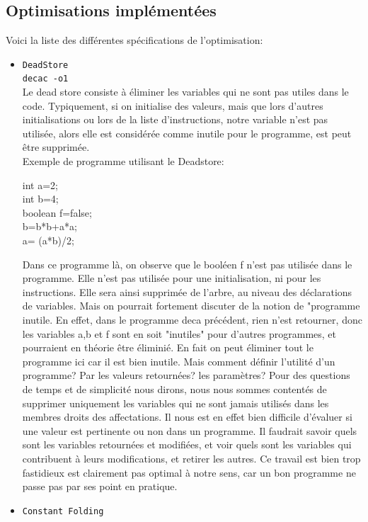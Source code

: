\documentclass[a4paper]{article}
\begin{document}
\subsection{Optimisations implémentées}
Voici la liste des différentes spécifications de l'optimisation:
\begin{itemize}
\item \texttt{DeadStore} \\
      \texttt{decac -o1} \\
Le dead store consiste à éliminer les variables qui ne sont pas utiles dans le code. Typiquement, si on initialise des valeurs, mais que lors d'autres initialisations ou lors de la liste d'instructions, notre variable n'est pas utilisée, alors elle est considérée comme inutile pour le programme, est peut être supprimée. \\
Exemple de programme utilisant le Deadstore:
\begin{center}
int a=2;\\
int b=4;\\
boolean f=false;\\
b=b*b+a*a;\\
a= (a*b)/2;\\
\end{center}
Dans ce programme là, on observe que le booléen f n'est pas utilisée dans le programme. Elle n'est pas utilisée pour une initialisation, ni pour les instructions. Elle sera ainsi supprimée de l'arbre, au niveau des déclarations de variables. Mais on pourrait fortement discuter de la notion de "programme inutile. En effet, dans le programme deca précédent, rien n'est retourner, donc les variables a,b et f sont en soit "inutiles" pour d'autres programmes, et pourraient en théorie être éliminié. En fait on peut éliminer tout le programme ici car il est bien inutile. Mais comment définir l'utilité d'un programme? Par les valeurs retournées? les paramètres? Pour des questions de temps et de simplicité
nous dirons, nous nous sommes contentés de supprimer uniquement les variables qui ne sont jamais utilisés dans les membres droits des affectations. Il nous est en effet bien difficile d'évaluer si une valeur est pertinente ou non dans un programme. Il faudrait savoir quels sont les variables retournées et modifiées, et voir quels sont les variables qui contribuent à leurs modifications, et retirer les autres. Ce travail est bien trop fastidieux est clairement pas optimal à notre sens, car un bon programme ne passe pas par ses point en pratique.
\item \texttt{Constant Folding}\\

\end{itemize}
\end{document}
